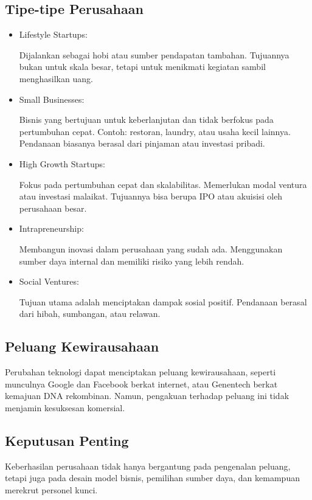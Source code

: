 \documentclass{article}
\begin{document}
\subsection{Tipe-tipe Perusahaan}
\begin{itemize}
    \item Lifestyle Startups:

          Dijalankan sebagai hobi atau sumber pendapatan tambahan. Tujuannya bukan untuk skala besar, tetapi untuk menikmati kegiatan sambil menghasilkan uang.

    \item Small Businesses:

          Bisnis yang bertujuan untuk keberlanjutan dan tidak berfokus pada pertumbuhan cepat. Contoh: restoran, laundry, atau usaha kecil lainnya. Pendanaan biasanya berasal dari pinjaman atau investasi pribadi.

    \item High Growth Startups:

          Fokus pada pertumbuhan cepat dan skalabilitas. Memerlukan modal ventura atau investasi malaikat. Tujuannya bisa berupa IPO atau akuisisi oleh perusahaan besar.

    \item Intrapreneurship:

          Membangun inovasi dalam perusahaan yang sudah ada. Menggunakan sumber daya internal dan memiliki risiko yang lebih rendah.

    \item Social Ventures:

          Tujuan utama adalah menciptakan dampak sosial positif. Pendanaan berasal dari hibah, sumbangan, atau relawan.
\end{itemize}

\subsection{Peluang Kewirausahaan}
Perubahan teknologi dapat menciptakan peluang kewirausahaan, seperti munculnya Google dan Facebook berkat internet, atau Genentech berkat kemajuan DNA rekombinan. Namun, pengakuan terhadap peluang ini tidak menjamin kesuksesan komersial.

\subsection{Keputusan Penting}
Keberhasilan perusahaan tidak hanya bergantung pada pengenalan peluang, tetapi juga pada desain model bisnis, pemilihan sumber daya, dan kemampuan merekrut personel kunci.
\end{document}
